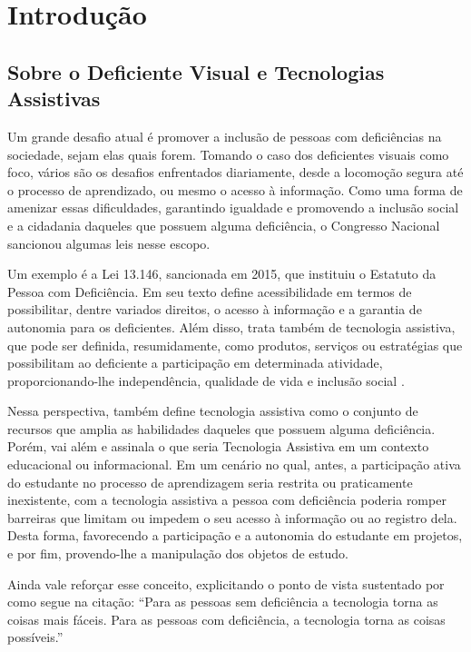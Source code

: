 \chapter{Introdução}

\section{Sobre o Deficiente Visual e Tecnologias Assistivas}

Um grande desafio atual é promover a inclusão de pessoas com deficiências na sociedade, sejam elas quais forem. Tomando o caso dos deficientes visuais como foco, vários são os desafios enfrentados diariamente, desde a locomoção segura até o processo de aprendizado, ou mesmo o acesso à informação. Como uma forma de amenizar essas dificuldades, garantindo igualdade e promovendo a inclusão social e a cidadania daqueles que possuem alguma deficiência, o Congresso Nacional sancionou algumas leis nesse escopo.

Um exemplo é a Lei 13.146, sancionada em 2015, que instituiu o Estatuto da Pessoa com Deficiência. Em seu texto define acessibilidade em termos de possibilitar, dentre variados direitos, o acesso à informação e a garantia de autonomia para os deficientes. Além disso, trata também de tecnologia assistiva, que pode ser definida, resumidamente, como produtos, serviços ou estratégias que possibilitam ao deficiente a participação em determinada atividade, proporcionando-lhe independência, qualidade de vida e inclusão social .

Nessa perspectiva,  também define tecnologia assistiva como o conjunto de recursos que amplia as habilidades daqueles que possuem alguma deficiência. Porém,  vai além e assinala o que seria Tecnologia Assistiva em um contexto educacional ou informacional. Em um cenário no qual, antes, a participação ativa do estudante no processo de aprendizagem seria restrita ou praticamente inexistente, com a tecnologia assistiva a pessoa com deficiência poderia romper barreiras que limitam ou impedem o seu acesso à informação ou ao registro dela. Desta forma, favorecendo a participação e a autonomia do estudante em projetos, e por fim, provendo-lhe a manipulação dos objetos de estudo.

Ainda vale reforçar esse conceito, explicitando o ponto de vista sustentado por  como segue na citação: ``Para as pessoas sem deficiência a tecnologia torna as coisas mais fáceis. Para as pessoas com deficiência, a tecnologia torna as coisas possíveis.''


